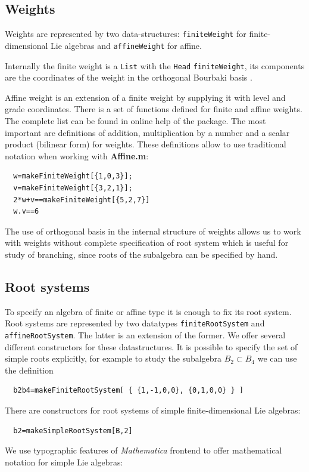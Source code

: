 \subsection{Weights}
\label{sec:weights}

Weights are represented  by two data-structures: \lstinline{finiteWeight} for finite-dimensional Lie algebras and \lstinline{affineWeight}  for affine.

Internally the finite weight is a \lstinline{List} with the
\lstinline{Head} \lstinline{finiteWeight}, its components are the
coordinates of the weight in the orthogonal Bourbaki  basis
\cite{bourbaki2002lie}.

Affine weight is an extension of a finite weight by supplying it
with level and grade coordinates. There is a set of functions
defined for finite and affine weights. The complete list can be
found in  online help of the package. The most important
are definitions of addition, multiplication by a number and a
scalar product (bilinear form) for weights. These definitions
allow to use traditional notation when working with {\bf
Affine.m}:
\begin{lstlisting}
  w=makeFiniteWeight[{1,0,3}];
  v=makeFiniteWeight[{3,2,1}];
  2*w+v==makeFiniteWeight[{5,2,7}]
  w.v==6
\end{lstlisting}

The use of orthogonal basis in the internal structure of weights allows us to work with weights without complete specification of root system which is useful for study of branching, since roots of the subalgebra can be specified by hand.

\subsection{Root systems}
\label{sec:root-systems}

To specify an algebra of finite or affine type it is enough to fix
its root system. Root systems are represented by two datatypes
\lstinline{finiteRootSystem} and \lstinline{affineRootSystem}. The
latter is an extension of the former. We offer several different
constructors for these datastructures. It is possible to specify
the set of simple roots explicitly, for example to study the
subalgebra $B_2\subset B_4$ we can use the definition
\begin{lstlisting}
  b2b4=makeFiniteRootSystem[ { {1,-1,0,0}, {0,1,0,0} } ]
\end{lstlisting}
There are constructors for root systems of simple finite-dimensional Lie algebras:
\begin{lstlisting}
  b2=makeSimpleRootSystem[B,2]
\end{lstlisting}
We use typographic features of {\it Mathematica} frontend to offer mathematical notation for simple Lie algebras:


